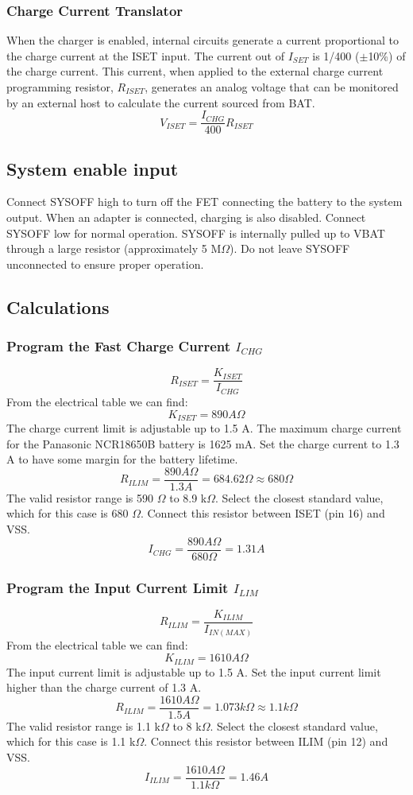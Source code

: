 \documentclass[11pt,a4paper]{article}
\begin{document}
\subsubsection{Charge Current Translator}
When the charger is enabled, internal circuits generate a current proportional to the charge current at the ISET input. The current out of $I_{SET}$ is 1/400 ($\pm$10\%) of the charge current. This current, when applied to the external charge current programming resistor, $R_{ISET}$, generates an analog voltage that can be monitored by an external host to calculate the current sourced from BAT.
\[ V_{ISET} = \frac{I_{CHG}}{400} R_{ISET} \]

\subsection{System enable input}
Connect SYSOFF high to turn off the FET connecting the battery to the system output. When an adapter is connected, charging is also disabled. Connect SYSOFF low for normal operation. SYSOFF is internally pulled up to VBAT through a large resistor (approximately 5 M$\Omega$). Do not leave SYSOFF unconnected to ensure proper operation.

\subsection{Calculations}
\subsubsection{Program the Fast Charge Current $I_{CHG}$}
\[ R_{ISET} = \frac{K_{ISET}}{I_{CHG}} \]
From the electrical table we can find:
\[ K_{ISET} = 890 A\Omega \]
The charge current limit is adjustable up to 1.5 A. The maximum charge current for the Panasonic NCR18650B battery is 1625 mA. Set the charge current to 1.3 A to have some margin for the battery lifetime.
\[ R_{ILIM} = \frac{890 A\Omega}{1.3 A} = 684.62 \Omega \approx 680 \Omega \]
The valid resistor range is 590 $\Omega$ to 8.9 k$\Omega$. Select the closest standard value, which for this case is 680 $\Omega$. Connect this resistor between ISET (pin 16) and VSS.
\[ I_{CHG} = \frac{890 A\Omega}{680 \Omega} = 1.31 A \]

\subsubsection{Program the Input Current Limit $I_{LIM}$}
\[ R_{ILIM} = \frac{K_{ILIM}}{I_{IN(MAX)}} \]
From the electrical table we can find:
\[ K_{ILIM} = 1610 A\Omega \]
The input current limit is adjustable up to 1.5 A. Set the input current limit higher than the charge current of 1.3 A.
\[ R_{ILIM} = \frac{1610 A\Omega}{1.5 A} = 1.073 k\Omega \approx 1.1 k\Omega  \]
The valid resistor range is 1.1 k$\Omega$ to 8 k$\Omega$. Select the closest standard value, which for this case is 1.1 k$\Omega$. Connect this resistor between ILIM (pin 12) and VSS.
\[ I_{ILIM} = \frac{1610 A\Omega}{1.1 k\Omega} = 1.46 A \]
\end{document}
